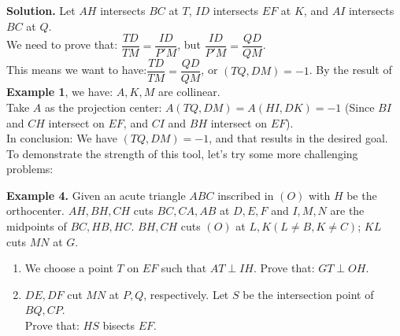\documentclass[a4paper,12pt,twoside]{book}
\begin{document}
{\textbf{Solution.} Let $AH$ intersects $BC$ at $T$, $ID$ intersects $EF$ at $K$, and $AI$ intersects $BC$ at $Q$.\\
We need to prove that: $\dfrac{TD}{TM}=\dfrac{ID}{P'M}$, but $\dfrac{ID}{P'M}=\dfrac{QD}{QM}$.\\
This means we want to have:$\dfrac{TD}{TM}=\dfrac{QD}{QM}$, or $(TQ,DM)=-1$.
By the result of \textbf{Example 1}, we have: $A,K,M$ are collinear.\\
Take $A$ as the projection center: $A(TQ,DM)=A(HI,DK)=-1$ (Since $BI$ and $CH$ intersect on $EF$, and $CI$ and $BH$ intersect on $EF$).\\
In conclusion: We have $(TQ,DM)=-1$, and that results in the desired goal.\\
To demonstrate the strength of this tool, let's try some more challenging problems:
\newpage
\begin{mybox}
\textbf{Example 4.} Given an acute triangle $ABC$ inscribed in $(O)$ with $H$ be the orthocenter. $AH, BH, CH$ cuts $BC, CA, AB$ at $D, E, F$ and $I, M, N$ are the midpoints of $BC, HB, HC$. $BH, CH$ cuts $(O)$ at $L,K(L \ne B, K \ne C)$; $KL$ cuts $MN$ at $G$.
\begin{enumerate}
 \item We choose a point $T$ on $EF$ such that $AT\perp IH$. Prove that: $GT \perp OH$.
 \item $DE, DF$ cut $MN$ at $P, Q$, respectively. Let $S$ be the intersection point of $BQ,CP$.\\Prove that: $HS$ bisects $EF$.
\end{enumerate}
\end{mybox}

\begin{center}


\end{center}}
\end{document}
